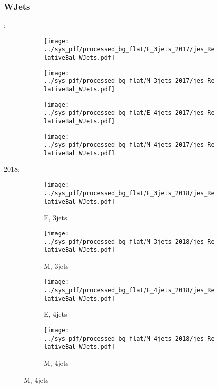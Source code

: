\documentclass{beamer}
\begin{document}
\begin{frame}
\frametitle{WJets}
\fontsize{5}{1}:
\begin{figure}
\centering
\begin{subfigure}[b]{0.24\textwidth}
\texttt{[image: ../sys\_pdf/processed\_bg\_flat/E\_3jets\_2017/jes\_RelativeBal\_WJets.pdf]}
\end{subfigure}
\begin{subfigure}[b]{0.24\textwidth}
\texttt{[image: ../sys\_pdf/processed\_bg\_flat/M\_3jets\_2017/jes\_RelativeBal\_WJets.pdf]}
\end{subfigure}
\begin{subfigure}[b]{0.24\textwidth}
\texttt{[image: ../sys\_pdf/processed\_bg\_flat/E\_4jets\_2017/jes\_RelativeBal\_WJets.pdf]}
\end{subfigure}
\begin{subfigure}[b]{0.24\textwidth}
\texttt{[image: ../sys\_pdf/processed\_bg\_flat/M\_4jets\_2017/jes\_RelativeBal\_WJets.pdf]}
\end{subfigure}
\end{figure}
2018:
\begin{figure}
\centering
\begin{subfigure}[b]{0.24\textwidth}
\texttt{[image: ../sys\_pdf/processed\_bg\_flat/E\_3jets\_2018/jes\_RelativeBal\_WJets.pdf]}
\captionsetup{font=tiny}
\caption{E, 3jets}
\end{subfigure}
\begin{subfigure}[b]{0.24\textwidth}
\texttt{[image: ../sys\_pdf/processed\_bg\_flat/M\_3jets\_2018/jes\_RelativeBal\_WJets.pdf]}
\captionsetup{font=tiny}
\caption{M, 3jets}
\end{subfigure}
\begin{subfigure}[b]{0.24\textwidth}
\texttt{[image: ../sys\_pdf/processed\_bg\_flat/E\_4jets\_2018/jes\_RelativeBal\_WJets.pdf]}
\captionsetup{font=tiny}
\caption{E, 4jets}
\end{subfigure}
\begin{subfigure}[b]{0.24\textwidth}
\texttt{[image: ../sys\_pdf/processed\_bg\_flat/M\_4jets\_2018/jes\_RelativeBal\_WJets.pdf]}
\captionsetup{font=tiny}
\caption{M, 4jets}
\end{subfigure}
\end{figure}
\end{frame}
\end{document}
